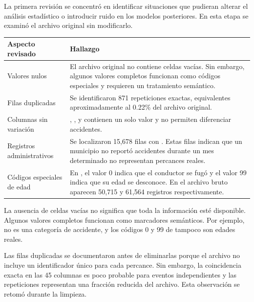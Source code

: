 \documentclass[11pt,letterpaper]{article}
\begin{document}
\begin{nota}
La primera revisión se concentró en identificar situaciones que pudieran alterar
el análisis estadístico o introducir ruido en los modelos posteriores. En esta
etapa se examinó el archivo original sin modificarlo.

\vspace{0.4em}
\begin{tabularx}{\textwidth}{L{4cm}Y}
    \toprule
    \textbf{Aspecto revisado} & \textbf{Hallazgo} \\
    \midrule
    Valores nulos
        & El archivo original no contiene celdas vacías. Sin embargo, algunos
          valores completos funcionan como códigos especiales y requieren un
          tratamiento semántico. \\
    Filas duplicadas
        & Se identificaron 871 repeticiones exactas, equivalentes
          aproximadamente al 0.22\% del archivo original. \\
    Columnas sin variación
        & , ,  y 
          contienen un solo valor y no permiten diferenciar accidentes. \\
    Registros administrativos
        & Se localizaron 15,678 filas con .
          Estas filas indican que un municipio no reportó accidentes durante un
          mes determinado no representan percances reales. \\
    Códigos especiales de edad
        & En , el valor 0 indica que el conductor se fugó y el
          valor 99 indica que su edad se desconoce. En el archivo bruto aparecen
          50,715 y 61,564 registros respectivamente. \\
    \bottomrule
\end{tabularx}
\end{nota}

\begin{nota}
La ausencia de celdas vacías no significa que toda la información esté
disponible. Algunos valores completos funcionan como marcadores semánticos. Por
ejemplo,  no es una categoría de accidente, y los códigos
0 y 99 de  tampoco son edades reales.

\vspace{0.4em}
Las filas duplicadas se documentaron antes de eliminarlas porque el archivo no
incluye un identificador único para cada percance. Sin embargo, la coincidencia
exacta en las 45 columnas es poco probable para eventos independientes y las
repeticiones representan una fracción reducida del archivo. Esta observación se
retomó durante la limpieza.
\end{nota}
\end{document}
